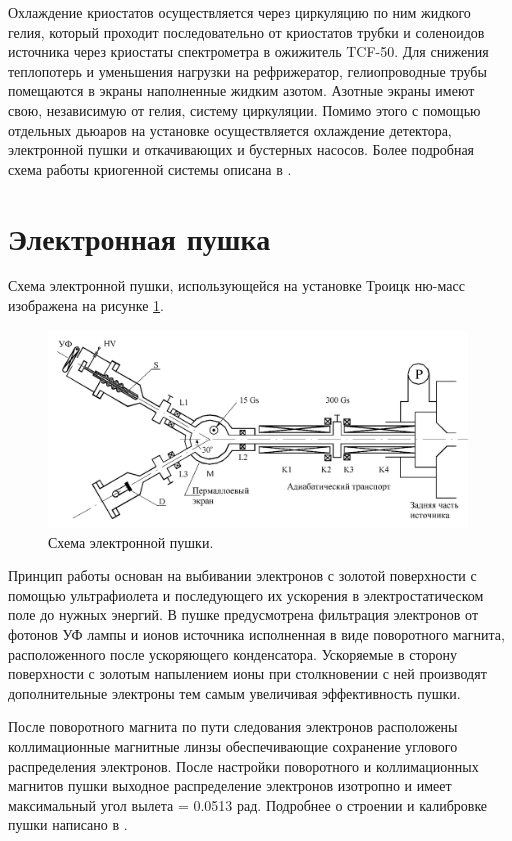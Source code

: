 \documentclass[a4paper,14pt]{extreport}
\begin{document}
Охлаждение криостатов осуществляется через циркуляцию по ним жидкого гелия, который проходит последовательно от криостатов трубки и соленоидов источника через криостаты спектрометра в ожижитель TCF-50. Для снижения теплопотерь и уменьшения нагрузки на рефрижератор, гелиопроводные трубы помещаются в экраны наполненные жидким азотом. Азотные экраны имеют свою, независимую от гелия, систему циркуляции. Помимо этого с помощью отдельных дьюаров на установке осуществляется охлаждение детектора, электронной пушки и откачивающих и бустерных насосов. Более подробная схема работы криогенной системы описана в \cite{cryogenic-1}\cite{cryogenic-2}.

\section{Электронная пушка}
Схема электронной пушки, использующейся на установке Троицк ню-масс изображена на рисунке \ref{fig:numass-gun}.

\begin{figure}
  \centering
  \includegraphics[width = 0.99\textwidth]{img/nu_mass_setup/gun.png}
    \caption{Схема электронной пушки.}
    \label{fig:numass-gun}
\end{figure}

Принцип работы основан на выбивании электронов с золотой поверхности с помощью ультрафиолета и последующего их ускорения в электростатическом поле до нужных энергий. В пушке предусмотрена фильтрация электронов от фотонов УФ лампы и ионов источника исполненная в виде поворотного магнита, расположенного после ускоряющего конденсатора. Ускоряемые в сторону поверхности с золотым напылением ионы при столкновении с ней производят дополнительные электроны тем самым увеличивая эффективность пушки.

После поворотного магнита по пути следования электронов расположены коллимационные магнитные линзы обеспечивающие сохранение углового распределения электронов. После настройки поворотного и коллимационных магнитов пушки выходное распределение электронов изотропно и имеет максимальный угол вылета = 0.0513 рад. Подробнее о строении и калибровке пушки написано в \cite{zadorogny}.
\end{document}
